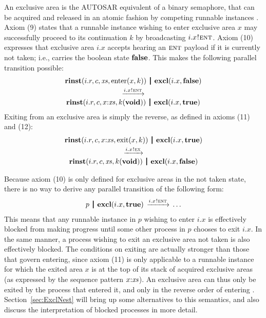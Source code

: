 \documentclass[10pt,conference]{IEEEtran}
\begin{document}
An exclusive area is the AUTOSAR equivalent of a binary semaphore, that can be acquired and released in an atomic fashion by competing runnable instances \cite[ch.~4.2.2.5]{AR:RTE}. Axiom (9) states that a runnable instance wishing to enter exclusive area $x$ may successfully proceed to its continuation $k$ by broadcasting $i.x \mspace{1mu}!\mspace{1mu} \textsc{ent}$. Axiom (10) expresses that exclusive area $i.x$ accepts hearing an ${\textsc{ent}}$ payload if it is currently not taken; i.e., carries the boolean state $\textbf{false}$. This makes the following parallel transition possible:
$$
\begin{array}{c}
  \Trinst {i.r} c \Xs {\TrteEnter x k}
  \Opar
  \Texcl {i.x} \Tfalse \vspace{0.6ex} \\
  \red {\say {i.x} \Tent} \\
  \Trinst {i.r} c {\Tcons x \Xs} {\Tap k \Tvoid}
  \Opar
  \Texcl {i.x} \Ttrue
\end{array}
$$
Exiting from an exclusive area is simply the reverse, as defined in axioms (11) and (12):
$$
\begin{array}{c}
  \Trinst {i.r} c {\Tcons x \Xs} {\TrteExit x k}
  \Opar
  \Texcl {i.x} \Ttrue \vspace{0.6ex} \\
  \red {\say {i.x} \Tex} \\
  \Trinst {i.r} c \Xs {\Tap k \Tvoid}
  \Opar
  \Texcl {i.x} \Tfalse
\end{array}
$$

Because axiom (10) is only defined for exclusive areas in the not taken state, there is no way to derive any parallel transition of the following form:
$$
\begin{array}{c}
  p \Opar {\Texcl {i.x} \Ttrue} \red{\say{i.x}{\Tent}} \ldots \\
\end{array}
$$
This means that any runnable instance in $p$ wishing to enter $i.x$ is effectively blocked from making progress until some other process in $p$ chooses to exit $i.x$. In the same manner, a process wishing to exit an exclusive area not taken is also effectively blocked. The conditions on exiting are actually stronger than those that govern entering, since axiom (11) is only applicable to a runnable instance for which the exited area $x$ is at the top of its stack of acquired exclusive areas (as expressed by the sequence pattern $\Tcons x \Xs$). An exclusive area can thus only be exited by the process that entered it, and only in the reverse order of entering \cite[ch.~5.6.28]{AR:RTE}. Section~\ref{sec:ExclNest} will bring up some alternatives to this semantics, and also discuss the interpretation of blocked processes in more detail.
\end{document}

